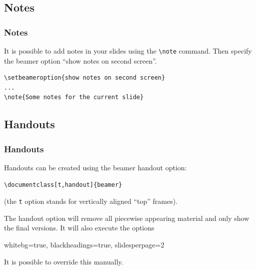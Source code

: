 \documentclass[t]{beamer}
\begin{document}
\subsection{Notes}
\begin{frame}[fragile]
\frametitle{Notes}

It is possible to add notes in your slides using the \lstinline|\note| command.
Then specify the beamer option ``show notes on second screen''.

\begin{lstlisting}
\setbeameroption{show notes on second screen}
...
\note{Some notes for the current slide}
\end{lstlisting}

\end{frame}

\subsection{Handouts}
\begin{frame}[fragile]
\frametitle{Handouts}

Handouts can be created using the beamer {\sf handout} option:

\begin{lstlisting}
\documentclass[t,handout]{beamer}
\end{lstlisting}

(the {\tt t} option stands for vertically aligned ``top'' frames).

The {\sf handout} option will remove all piecewise appearing material and only show the final versions. It will also execute the options

{\sf whitebg=true, blackheadings=true, slidesperpage=2}

It is possible to override this manually.
\end{frame}

\end{document}
